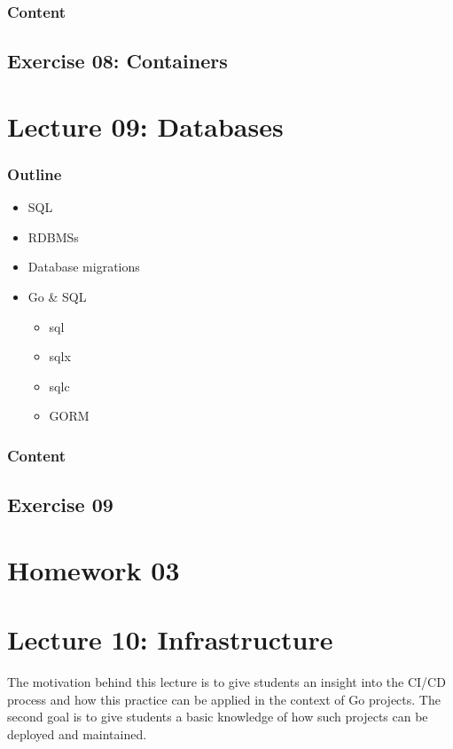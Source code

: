 \documentclass[
  digital,
  color,
  oneside,
  nosansbold,
  nocolorbold,
  lof,
  lot,
]{fithesis4}
\begin{document}
\subsubsection{Content}

\subsection{Exercise 08: Containers}

\section{Lecture 09: Databases}

\subsubsection{Outline}

\begin{itemize}
    \item SQL
    \item RDBMSs
    \item Database migrations
    \item Go \& SQL
    \begin{itemize}
        \item sql
        \item sqlx
        \item sqlc
        \item GORM
    \end{itemize}
\end{itemize}

\subsubsection{Content}

\subsection{Exercise 09}

\section{Homework 03}

\section{Lecture 10: Infrastructure}

The motivation behind this lecture is to give students an insight into the CI/CD process and how this practice can be applied in the context of Go projects. The second goal is to give students a basic knowledge of how such projects can be deployed and maintained.
\end{document}
